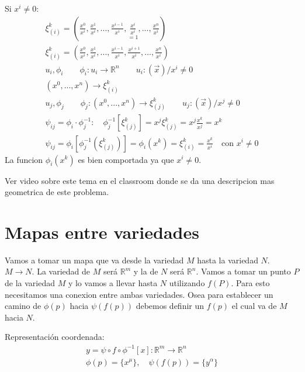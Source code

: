 \documentclass{article}
\newcommand{\caja}[3]{%
  \begin{tcolorbox}[colback=#1!5!white,colframe=#1!25!black,title=#2]
    #3
  \end{tcolorbox}%
}
\begin{document}
Si $ x ^ {i } \neq 0  $: 
\begin{gather*}
  \xi _{(i)} ^ {k } = \left(\frac{x ^ {0 }}{x ^i }, \frac{x^1 }{x^i }, ..., \frac{x ^ {i-1 }}{x ^ {i }}, \underset{=1 }{\frac{x^i }{x^i }}, ..., \frac{x^n }{x^i }\right)\\
  \xi _{(i) } ^ {k } = \left(\frac{x^0 }{x^i }, \frac{x^1 }{x^i }, ..., \frac{x ^ {i-1 }}{x^i }, \frac{x ^ {i+1 }}{x^i }, ..., \frac{x^n }{x^i }\right)\\
  u_i, \phi_i \qquad \phi_i : u_i \rightarrow \mathbb{R} ^ {n } \qquad u_i : (\vec x )/ x ^ {i }\neq 0 \\
  (x^0,...,x^n) \rightarrow \xi _{(i)} ^ {k }\\
  u_j, \phi_j \qquad \phi_j : (x^0,...,x^n) \rightarrow \xi _{(j)} ^ {k } \qquad u_j : (\vec x )/ x ^ {j }\neq 0 \\
  \psi _{ij }  = \phi _i \cdot \phi_j ^ {-1 }: \quad \phi _j ^ {-1 }[\xi _{(j)} ^ {k }] = x ^ {j }\xi _{(j)} ^ {k } = x ^ {j } \frac{x ^ {k }}{x ^ {j }} = x ^ {k }\\
  \psi _{ij } = \phi _i [\phi_j ^ {-1 }(\xi _{(j)} ^ {k })] = \phi_i (x ^ {k }) = \xi _{(i)} ^ {k } = \frac{x ^k }{x ^i } \quad \text{con }x ^i \neq 0 
\end{gather*}
La funcion $ \phi_i (x ^ {k }) $ es bien comportada ya que $ x^i \neq 0 $.
\caja{black}{}{
  Ver video sobre este tema en el classroom donde se da una descripcion mas geometrica de este problema.
}

\section{Mapas entre variedades }
Vamos a tomar un mapa que va desde la variedad $ M  $ hasta la variedad $ N  $. $ M \rightarrow N  $. La variedad de $ M  $ será $ \mathbb{R}^m  $ y la de $ N  $ será $ \mathbb{R}^n  $. Vamos a tomar un punto $ P  $ de la variedad $ M  $ y lo vamos a llevar hasta $ N  $ utilizando $ f(P)  $. Para esto necesitamos una conexion entre ambas variedades. Osea para establecer un camino de $ \phi (p)  $ hacia $ \psi(f(p)) $ debemos definir un $ f(p)  $ el cual va de $ M  $ hacia $ N  $.

Representación coordenada: 
\begin{gather*}
  y = \psi\circ f \circ \phi ^ {-1 }[x] : \mathbb{R}^ {m } \rightarrow \mathbb{R} ^ {n }\\
  \phi(p) = \{x ^ {\mu }\}, \quad \psi (f(p)) = \{y ^ {\alpha }\}
\end{gather*}
\end{document}

